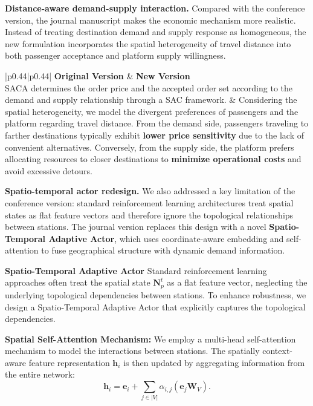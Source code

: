 \documentclass[11pt, a4paper]{article}
\begin{document}
\begin{itemize}
    \textbf{Distance-aware demand-supply interaction.} Compared with the conference version, the journal manuscript makes the economic mechanism more realistic. Instead of treating destination demand and supply response as homogeneous, the new formulation incorporates the spatial heterogeneity of travel distance into both passenger acceptance and platform supply willingness.

    \begin{tabular}{|p{0.44\textwidth}|p{0.44\textwidth}|}
        \hline
        \textbf{Original Version} & \textbf{New Version}\\
        \hline
        SACA determines the order price and the accepted order set according to the demand and supply relationship through a SAC framework. &
        Considering the spatial heterogeneity, we model the divergent preferences of passengers and the platform regarding travel distance. From the demand side, passengers traveling to farther destinations typically exhibit \textbf{lower price sensitivity} due to the lack of convenient alternatives. Conversely, from the supply side, the platform prefers allocating resources to closer destinations to \textbf{minimize operational costs} and avoid excessive detours.\\
        \hline
    \end{tabular}

    \textbf{Spatio-temporal actor redesign.} We also addressed a key limitation of the conference version: standard reinforcement learning architectures treat spatial states as flat feature vectors and therefore ignore the topological relationships between stations. The journal version replaces this design with a novel \textbf{Spatio-Temporal Adaptive Actor}, which uses coordinate-aware embedding and self-attention to fuse geographical structure with dynamic demand information.
    
    \begin{boxedminipage}[htbp]{\linewidth}
    \vspace{2mm}
    \textbf{Spatio-Temporal Adaptive Actor}
    Standard reinforcement learning approaches often treat the spatial state $\mathbf{N}_p^t$ as a flat feature vector, neglecting the underlying topological dependencies between stations. To enhance robustness, we design a {Spatio-Temporal Adaptive Actor} that explicitly captures the topological dependencies.
    
    \textbf{Spatial Self-Attention Mechanism:} We employ a multi-head self-attention mechanism to model the interactions between stations. The spatially context-aware feature representation $\mathbf{h}_i$ is then updated by aggregating information from the entire network:
    \begin{equation}
        \mathbf{h}_i = \mathbf{e}_i + \sum_{j \in |V|} \alpha_{i,j} (\mathbf{e}_j\mathbf{W}_V).
    \end{equation}
    \end{boxedminipage}


\end{itemize}
\end{document}
